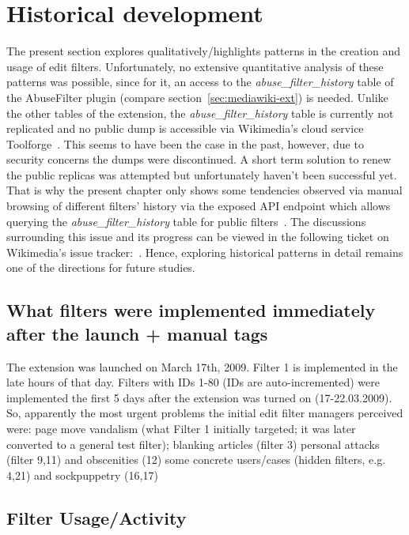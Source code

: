 \section{Historical development}
\label{sec:5-history}

The present section explores qualitatively/highlights patterns in the creation and usage of edit filters.
Unfortunately, no extensive quantitative analysis of these patterns was possible, since for it, an access to the \emph{abuse\_filter\_history} table of the AbuseFilter plugin (compare section~\ref{sec:mediawiki-ext}) is needed.
Unlike the other tables of the extension, the \emph{abuse\_filter\_history} table is currently not replicated and no public dump is accessible via Wikimedia's cloud service Toolforge~\cite{Wikimedia:ToolforgeDatabases}.
This seems to have been the case in the past, however, due to security concerns the dumps were discontinued.
A short term solution to renew the public replicas was attempted but unfortunately haven't been successful yet.
That is why the present chapter only shows some tendencies observed via manual browsing of different filters' history via the exposed API endpoint which allows querying the \emph{abuse\_filter\_history} table for public filters~\cite{Wikipedia:AbuseFilterHistory}.
The discussions surrounding this issue and its progress can be viewed in the following ticket on Wikimedia's issue tracker:~\cite{phabricator}.
Hence, exploring historical patterns in detail remains one of the directions for future studies.

\subsection{What filters were implemented immediately after the launch + manual tags}
The extension was launched on March 17th, 2009.
Filter 1 is implemented in the late hours of that day.
Filters with IDs 1-80 (IDs are auto-incremented) were implemented the first 5 days after the extension was turned on (17-22.03.2009).
So, apparently the most urgent problems the initial edit filter managers perceived were:
page move vandalism (what Filter 1 initially targeted; it was later converted to a general test filter);
blanking articles (filter 3)
personal attacks (filter 9,11) and obscenities (12)
some concrete users/cases (hidden filters, e.g. 4,21) and sockpuppetry (16,17)

\subsection{Filter Usage/Activity}

